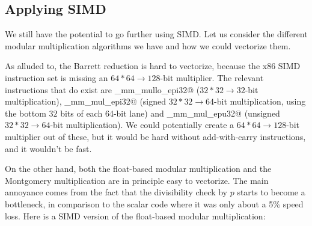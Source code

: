\subsection{Applying SIMD}

We still have the potential to go further using SIMD.
Let us consider the different modular multiplication algorithms we have and how we could vectorize them.

As alluded to, the Barrett reduction is hard to vectorize, because the x86 SIMD instruction set is missing an \mbox{$64*64\rightarrow128$}-bit multiplier.
The relevant instructions that do exist are \verb@_mm_mullo_epi32@ (\mbox{$32*32\rightarrow32$}-bit multiplication), \verb@_mm_mul_epi32@ (signed \mbox{$32*32\rightarrow64$}-bit multiplication, using the bottom $32$ bits of each 64-bit lane) and \verb@_mm_mul_epu32@ (unsigned \mbox{$32*32\rightarrow64$}-bit multiplication).
We could potentially create a \mbox{$64*64\rightarrow128$}-bit multiplier out of these, but it would be hard without add-with-carry instructions, and it wouldn't be fast.

On the other hand, both the float-based modular multiplication and the Montgomery multiplication are in principle easy to vectorize.
The main annoyance comes from the fact that the divisibility check by $p$ starts to become a bottleneck, in comparison to the scalar code where it was only about a 5\% speed loss.
Here is a SIMD version of the float-based modular multiplication:

